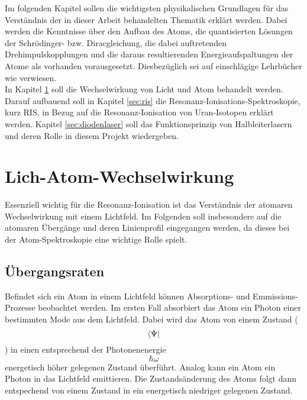Im folgenden Kapitel sollen die wichtigsten physikalischen Grundlagen für das
Verständnis der in dieser Arbeit behandelten Thematik erklärt werden. Dabei werden die
Kenntnisse über den Aufbau des Atoms, die quantisierten Lösungen der
Schrödinger- bzw. Diracgleichung, die dabei auftretenden Drehimpulskopplungen
und die daraus resultierenden Energieaufspaltungen der Atome als vorhanden
vorausgesetzt. Diesbezüglich sei auf einschlägige Lehrbücher wie
\cite{demtroeder:ex3} verwiesen.\\
In Kapitel \ref{sec:licht-atom-wechselwirkung} soll die Wechselwirkung von
Licht und Atom behandelt werden. Darauf aufbauend soll
in Kapitel \ref{sec:ris} die Resonanz-Ionisations-Spektroskopie,
kurz RIS, in Bezug auf die Resonanz-Ionisation von Uran-Isotopen erklärt
werden. Kapitel \ref{sec:diodenlaser} soll das Funktionsprinzip von
Halbleiterlasern und deren Rolle in diesem Projekt wiedergeben.

\section{Lich-Atom-Wechselwirkung}\label{sec:licht-atom-wechselwirkung}

Essenziell wichtig für die Resonanz-Ionisation ist das Verständnis der atomaren
Wechselwirkung mit einem Lichtfeld. Im Folgenden soll insbesondere auf die
atomaren Übergänge und deren Linienprofil eingegangen werden, da dieses bei der
Atom-Spektroskopie eine wichtige Rolle spielt.




\subsection{Übergangsraten}\label{subsec:uebergangsraten}
Befindet sich ein Atom in einem Lichtfeld können Absorptions- und
Emmissions-Prozesse beobachtet werden. Im ersten Fall absorbiert das Atom ein
Photon einer bestimmten Mode aus dem Lichtfeld. Dabei wird das Atom von einem
Zustand ($$\bra{\Psi}$$) in einen entsprechend der Photonenenergie
$$\hbar\omega$$ energetisch höher gelegenen Zustand überführt. Analog kann ein Atom ein Photon in das Lichtfeld
emittieren. Die Zustandsänderung des Atoms folgt dann entspechend von einem
Zustand in ein energetisch niedriger gelegenen Zustand.\\


